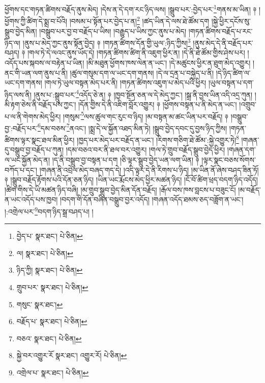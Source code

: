 ཕྱོགས་དང་གཏན་ཚིགས་བརྗོད་ནུས་མེད། །དེས་ན་དེ་དག་རང་ཉིད་ལས། །སྒྲུབ་པར་:བྱེད་པར་\footnote{བྱེད་པ་  སྣར་ཐང་།  པེ་ཅིན། }གནས་མ་ཡིན། ༈ །ཕྱོགས་ཀྱི་ཚིག་དེ་སྨྲ་བ་པོའི། །བསམ་པ་སྟོན་པར་བྱེད་པ་ན།\footnote{ལ།  སྣར་ཐང་།  པེ་ཅིན། } །ཚད་ཡིན་དེ་ལས་ཐེ་ཚོམ་དག །སྐྱེ་ཕྱིར་དངོས་སུ་སྒྲུབ་བྱེད་མིན། །བསྒྲུབ་པར་བྱ་བ་བརྗོད་པ་ཡིས། །བརྒྱུད་པ་ཡིས་ཀྱང་ནུས་པ་མེད། །གཏན་ཚིགས་བརྗོད་པ་རང་ཉིད་ལ། །ནུས་པ་མེད་ཀྱང་ནུས་སྟོན་བྱེད། ༈ །གཏན་ཚིགས་དོན་གྱི་ཡུལ་:ཉིད་ཀྱིས།\footnote{ཉིད་ཀྱི།  སྣར་ཐང་།  པེ་ཅིན། } །ནུས་མེད་དེ་ནི་བརྗོད་པར་བཤད། ༈ །གལ་ཏེ་དེ་ལའང་ནུས་ཡོད་དེ། །གཏན་ཚིགས་ཚིག་ནི་འཇུག་ཕྱིར་ན། །དེ་ནི་ཐེ་ཚོམ་གྱིས་ཤེས་པར། །འདོད་པས་སྐབས་ལ་བརྟེན་པ་ཡིན། །མི་མཐུན་ཕྱོགས་ཁས་ལེན་ན་ཡང་། །དེ་མཚུངས་ཕྱིར་ན་ཐུག་མེད་འགྱུར། །ནང་གི་ཡན་ལག་ནུས་པ་ནི། །ཚུལ་གསུམ་དག་ལ་ཡང་དག་གནས། །དེ་ལ་དྲན་པ་བསྐྱེད་པ་ནི། །དེ་ཉིད་ཚིག་ལ་ཡང་དག་གནས། །གལ་ཏེ་ཡུལ་བསྟན་མེད་པར་ནི། །གཏན་ཚིགས་འཇུག་པ་མེད་པའི་ཕྱིར། །ཡུལ་བསྟན་པ་དག་ཉིད་ལས་ནི། །ནུས་པ་:སྒྲུབ་པར་\footnote{གྲུབ་པར་  སྣར་ཐང་།  པེ་ཅིན། }འདོད་ཅེ་ན། ༈ །ཁྱབ་སྔོན་ཅན་ལ་དེ་མེད་ཀྱང་། །སྒྲ་ནི་བྱས་ཡིན་འདི་འདྲ་ཀུན། །མི་རྟག་ཅེས་ནི་བརྗོད་པས་ཀྱང་། །དོན་གྱིས་དེ་ནི་འཇིག་བློར་འགྱུར། ༈ །ཕྱོགས་བསྟན་པ་ནི་མེད་ན་ཡང་། །འགྲུབ་པ་ལ་ནི་གེགས་མེད་ཕྱིར། །གསུམ་\footnote{གསུང་  སྣར་ཐང་། }ལས་ཚུལ་གང་རུང་བ་ཉིད། །མ་བསྟན་མ་ཚང་ཡིན་པར་བརྗོད། ༈ །བསྒྲུབ་བྱ་:བརྗོད་པར་\footnote{བརྗོད་པ་  སྣར་ཐང་།  པེ་ཅིན། }དམ་བཅས་\footnote{བཅའ་  སྣར་ཐང་།  པེ་ཅིན། }ནའང་། །སྨྲ་དེ་ལ་སྐྱོན་འཐད་མིན་ཏེ། །སྒྲུབ་བྱེད་དབང་དུ་བྱས་ཉིད་ཀྱིས། །གཏན་ཚིགས་ལྟར་སྣང་ཐལ་མིན་ཕྱིར། །ཁྱད་པར་མེད་པར་བརྗོད་ན་ཡང་། །རིགས་གཅིག་ཐེ་ཚོམ་:སྐྱེ་འགྱུར་ཏེ།\footnote{སྐྱེ་བར་འགྱུར་རོ  སྣར་ཐང་། འགྱུར་རོ།  པེ་ཅིན། } །གཞན་དུ་བསྒྲུབ་བྱ་བརྗོད་པ་ཀུན། །དམ་བཅའ་བར་ནི་ཐལ་བར་འགྱུར། །གལ་ཏེ་གྲུབ་བརྗོད་སྒྲུབ་བྱེད་ཕྱིར། །གཞན་དག་ལ་ཡང་སྐྱོན་མེད་ན། །ད་ནི་བསྒྲུབ་བྱ་བསྟན་པ་དག །ཅི་ལྟར་སྒྲུབ་བྱེད་ཡན་ལག་ཡིན། ༈ །ལྟར་སྣང་བཅས་སོགས་བཀོད་པ་དང་། །གཞན་ནི་འབྲེལ་མེད་བཞད་གད་དེ། །འདི་ལྟར་དེ་ནི་རིགས་པ་ཉིད། །མ་ཡིན་ནོ་ཞེས་བཤད་ཟིན་ཏོ། ༈ །སྒྲུབ་བརྗོད་རྟོགས་པའི་དོན་ཅན་ཉིད། །ཡིན་ཡང་རྨོངས་མེད་ཕྱིར་མཚན་ཉིད། །ངོ་བོ་ཚིག་ཕྲད་བདག་ཉིད་འདོད། །ཚིག་གིས་དེ་ཡི་མཚན་ཉིད་བཞི། །མ་གྲུབ་སྒྲུབ་བྱེད་མིན་དོན་བརྗོད། །རྒོལ་བས་ཁས་བླངས་པ་བཟུང་ངོ། །མ་བརྗོད་ན་ཡང་འདོད་པས་ཁྱབ། །བདག་གི་དོན་བཞིན་བསྒྲུབ་བྱར་འདོད། །གཞན་འདོད་ཐམས་ཅད་བཟློག་ན་ཡང་། །:འགྲེལ་པར་\footnote{འགྲེལ་པ་  སྣར་ཐང་།  པེ་ཅིན། }བདག་ཉིད་སྒྲ་བཤད་པ། །
